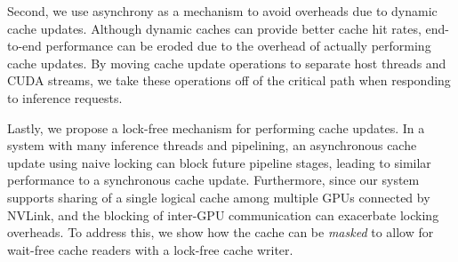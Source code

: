 
Second, we use asynchrony as a mechanism to avoid overheads due to dynamic cache updates. Although dynamic caches can provide better cache hit rates, end-to-end performance can be eroded due to the overhead of actually performing cache updates. By moving cache update operations to separate host threads and CUDA streams, we take these operations off of the critical path when responding to inference requests. 

Lastly, we propose a lock-free mechanism for performing cache updates. In a system with many inference threads and pipelining, an asynchronous cache update using naive locking can block future pipeline stages, leading to similar performance to a synchronous cache update. Furthermore, since our system supports sharing of a single logical cache among multiple GPUs connected by NVLink, and the blocking of inter-GPU communication can exacerbate locking overheads. To address this, we show how the cache can be \textit{masked} to allow for wait-free cache readers with a lock-free cache writer.

